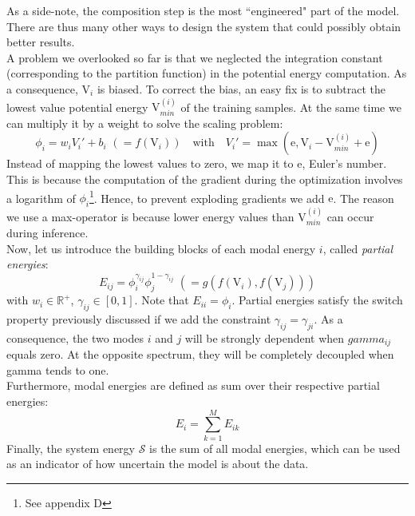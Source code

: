 \documentclass[12pt]{report}
\begin{document}
\indent As a side-note, the composition step is the most ``engineered" part of the model. There are thus many other ways to design the system that could possibly obtain better results. \\

\indent A problem we overlooked so far is that we neglected the integration constant (corresponding to the partition function) in the potential energy computation. As a consequence, $\mathrm{V}_i$ is biased. To correct the bias, an easy fix is to subtract the lowest value potential energy $\mathrm{V}_{min}^{(i)}$ of the training samples. At the same time we can multiply it by a weight to solve the scaling problem:
\begin{equation}
\phi_i = w_iV_i' + b_i \,\,(= f(\mathrm{V}_i)) \quad \text{with} \quad V_i' = \max(\mathrm{e}, \mathrm{V}_i - \mathrm{V}_{min}^{(i)} + \mathrm{e})
\end{equation} 
Instead of mapping the lowest values to zero, we map it to $\mathrm{e}$, Euler's number. This is because the computation of the gradient during the optimization involves a logarithm of $\phi_i$\footnote{See appendix D}. Hence, to prevent exploding gradients we add $\mathrm{e}$. The reason we use a max-operator is because lower energy values than $\mathrm{V}_{min}^{(i)}$ can occur during inference.\\[0.38cm]

\indent Now, let us introduce the building blocks of each modal energy $i$, called \textit{partial energies}:
\begin{equation}
E_{ij} = \phi_i^{\gamma_{ij}} \phi_j^{1-\gamma_{ij}} \,\,(= g(f(\mathrm{V}_i), f(\mathrm{V}_j)))
\end{equation}
with $w_i \in \mathbb{R}^+$, $\gamma_{ij} \in [0,1]$. Note that $E_{ii} = \phi_i$. Partial energies satisfy the switch property previously discussed if we add the constraint $\gamma_{ij} = \gamma_{ji}$. As a consequence, the two modes $i$ and $j$ will be strongly dependent when $gamma_{ij}$ equals zero. At the opposite spectrum, they will be completely decoupled when gamma tends to one.\\

\indent Furthermore, modal energies are defined as sum over their respective partial energies:
\begin{equation}
E_i = \sum_{k=1}^M E_{ik}
\end{equation}
Finally, the system energy $\mathcal{S}$ is the sum of all modal energies, which can be used as an indicator of how uncertain the model is about the data.\\
\end{document}
